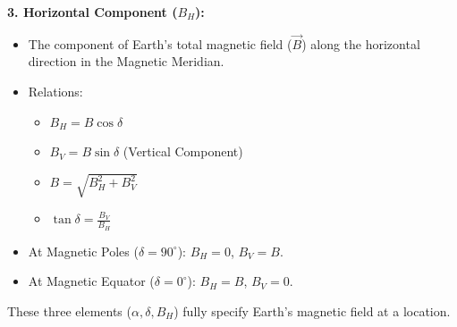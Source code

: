 \begin{frame}[t]
    \item<+-> \textbf{3.   Horizontal Component ($B_H$):}
        \begin{itemize}[<+->]
              \item The component of Earth's total magnetic field ($\vec{B}$) along the horizontal direction in the Magnetic Meridian.
              \item Relations:
                \begin{itemize}
                      \item $B_H = B \cos\delta$
                      \item $B_V = B \sin\delta$ (Vertical Component)
                      \item $B = \sqrt{B_H^2 + B_V^2}$
                      \item $\tan\delta = \frac{B_V}{B_H}$
                \end{itemize}
              \item At Magnetic Poles ($\delta=90^\circ$): $B_H = 0$, $B_V = B$.
              \item At Magnetic Equator ($\delta=0^\circ$): $B_H = B$, $B_V = 0$.
        \end{itemize}
      \item<+-> These three elements ($\alpha, \delta, B_H$) fully specify Earth's magnetic field at a location.
\end{frame}

\transfade[duration=0.5]

